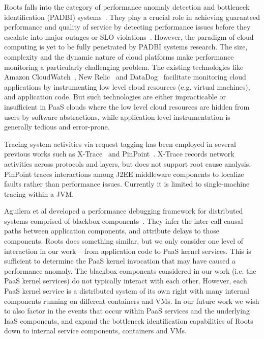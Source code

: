 Roots falls into the category of performance anomaly detection and bottleneck identification 
(PADBI) systems~\cite{Ibidunmoye:2015:PAD:2808687.2791120}. 
They play a crucial role in achieving guaranteed performance and
quality of service by detecting performance issues before they escalate into major outages
or SLO violations~\cite{6045942}. 
However, the paradigm of cloud computing is yet to be
fully penetrated by PADBI systems research. The size, complexity and the dynamic nature of 
cloud platforms make performance monitoring a particularly challenging problem.
The existing technologies like Amazon CloudWatch~\cite{cloudwatch},
New Relic~\cite{newrelic} and DataDog~\cite{datadog} facilitate monitoring cloud applications 
by instrumenting low level cloud resources (e.g. virtual machines), and application code. But such technologies
are either impracticable or insufficient in
PaaS clouds where the low level cloud resources are hidden from users by software abstractions, while
application-level instrumentation is generally tedious and error-prone.

Tracing system activities via request tagging has been employed in several
previous works such as X-Trace~\cite{Fonseca:2007:XPN:1973430.1973450} and 
PinPoint~\cite{Chen:2002:PPD:647883.738238}.
X-Trace records network activities across protocols and layers, but
does not support root cause analysis. PinPoint traces
interactions among J2EE middleware components to localize faults rather than performance
issues. Currently it is limited to single-machine tracing within a JVM.

Aguilera et al developed a performance debugging framework for distributed systems comprised of
blackbox components~\cite{Aguilera:2003:PDD:945445.945454}. 
They infer the inter-call causal paths between application components, and attribute delays to those
components. Roots does something similar, but we only consider one level of
interaction in our work -- from application code to PaaS kernel services. This is sufficient
to determine the PaaS kernel invocation that may have caused a performance anomaly.
The blackbox components considered in our work (i.e. the PaaS kernel services) do not
typically interact with each other. However, each PaaS kernel service is a distributed system
of its own right with many internal components running on different containers and VMs.
In our future work we wish to also factor in the events that occur within PaaS services
and the underlying IaaS components, 
and expand the bottleneck identification capabilities of Roots down to internal
service components, containers and VMs.

